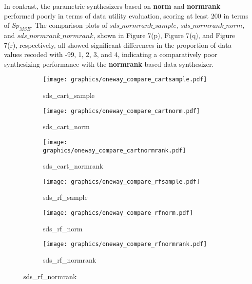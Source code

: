 In contrast, the parametric synthesizers based on \textbf{norm} and \textbf{normrank} performed poorly in terms of data utility evaluation, scoring at least 200 in terms of $Sp_{MSE}$. The comparison plots of $sds\_normrank\_sample$, $sds\_normrank\_norm$, and $sds\_normrank\_normrank$, shown in Figure 7(p), Figure 7(q), and Figure 7(r), respectively, all showed significant differences in the proportion of data values recoded with -99, 1, 2, 3, and 4, indicating a comparatively poor synthesizing performance with the \textbf{normrank}-based data synthesizer.
\begin{figure}[H]
\centering
    \begin{subfigure}{0.32\textwidth}
        \centering
        \texttt{[image: graphics/oneway\_compare\_cartsample.pdf]}  
        \caption{sds\_cart\_sample}
        \label{subfig:cartsampleD9}
    \end{subfigure}
    \begin{subfigure}{0.32\textwidth}
        \centering
        \texttt{[image: graphics/oneway\_compare\_cartnorm.pdf]}  
        \caption{sds\_cart\_norm}
        \label{subfig:cartnormD9}
    \end{subfigure}
    \begin{subfigure}{0.32\textwidth}
        \centering
        \texttt{[image: graphics/oneway\_compare\_cartnormrank.pdf]}  
        \caption{sds\_cart\_normrank}
        \label{subfig:cartnormrankD9}
    \end{subfigure}
    \medskip
    \begin{subfigure}{0.32\textwidth}
        \centering
        \texttt{[image: graphics/oneway\_compare\_rfsample.pdf]}  
        \caption{sds\_rf\_sample}
        \label{subfig:rfsampleD9}
    \end{subfigure}
    \begin{subfigure}{0.32\textwidth}
        \centering
        \texttt{[image: graphics/oneway\_compare\_rfnorm.pdf]}  
        \caption{sds\_rf\_norm}
        \label{subfig:rfnormD9}
    \end{subfigure}
    \begin{subfigure}{0.32\textwidth}
        \centering
        \texttt{[image: graphics/oneway\_compare\_rfnormrank.pdf]}  
        \caption{sds\_rf\_normrank}
        \label{subfig:rfnormrankD9}
    \end{subfigure}
    \medskip

\end{figure}
